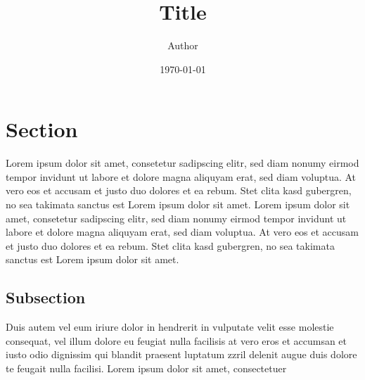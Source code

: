 \documentclass[12pt]{article}
\title{Title}
\author{Author}
\date{\today}
\begin{document}
\maketitle

\newpage

\tableofcontents
\newpage

\section{Section}

Lorem ipsum dolor sit amet, consetetur sadipscing elitr, sed diam nonumy eirmod
tempor invidunt ut labore et dolore magna aliquyam erat, sed diam voluptua. At
vero eos et accusam et justo duo dolores et ea rebum. Stet clita kasd gubergren,
no sea takimata sanctus est Lorem ipsum dolor sit amet. Lorem ipsum dolor sit
amet, consetetur sadipscing elitr, sed diam nonumy eirmod tempor invidunt ut
labore et dolore magna aliquyam erat, sed diam voluptua. At vero eos et accusam
et justo duo dolores et ea rebum. Stet clita kasd gubergren, no sea takimata
sanctus est Lorem ipsum dolor sit amet.

\subsection{Subsection}

Duis autem vel eum iriure dolor in hendrerit in vulputate velit esse molestie
consequat, vel illum dolore eu feugiat nulla facilisis at vero eros et accumsan
et iusto odio dignissim qui blandit praesent luptatum zzril delenit augue duis
dolore te feugait nulla facilisi. Lorem ipsum dolor sit amet, consectetuer

\newpage

\printbibliography[title={Referencias}]
\end{document}
